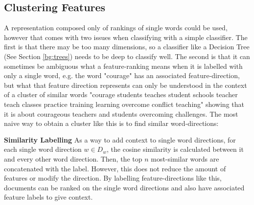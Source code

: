 \subsection{Clustering Features}\label{ch3:LabellingWords}
A representation composed only of rankings of single words could be used, however that comes with two issues when classifying with a simple  classifier. The first is that there may be too many dimensions, so a  classifier like a Decision Tree (See Section \ref{bg:trees})  needs to be deep to classify well. The second is that it can sometimes be ambiguous what a feature-ranking means when it is labelled with only a single word, e.g. the word "courage" has an associated feature-direction, but what that feature direction represents can only be understood in the context of a cluster of similar words "courage students teaches student schools teacher teach classes practice training learning overcome conflict teaching" showing that it is about courageous teachers and students overcoming challenges. The most naive way to obtain a cluster like this is to find similar word-directions: 

\noindent \textbf{Similarity Labelling} As a way to add context to single word directions, for each single word direction $w \in D_w$, the cosine similarity is calculated between it and every other word direction. Then, the top $n$ most-similar words are concatenated with the label.  However, this does not reduce the amount of features or modify the direction. By labelling feature-directions like this, documents can be ranked on the single word directions and also have associated feature labels to give context.%

